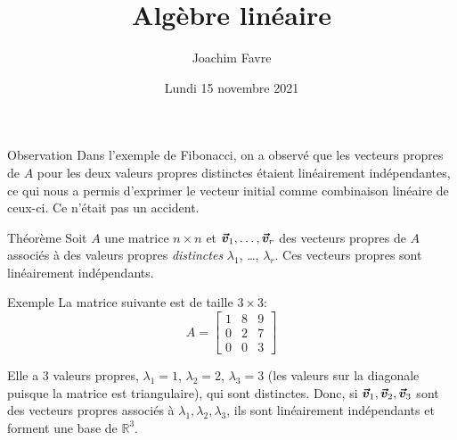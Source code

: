 \documentclass[a4paper]{article}
\title{Algèbre linéaire}
\author{Joachim Favre}
\date{Lundi 15 novembre 2021}
\begin{document}
\maketitle


\begin{parag}{Observation}
    Dans l'exemple de Fibonacci, on a observé que les vecteurs propres de $A$ pour les deux valeurs propres distinctes étaient linéairement indépendantes, ce qui nous a permis d'exprimer le vecteur initial comme combinaison linéaire de ceux-ci. Ce n'était pas un accident.
\end{parag}

\begin{parag}{Théorème}
    Soit $A$ une matrice $n\times n$ et $\bm{\protect\vec{v}}_1, \ldots, \bm{\protect\vec{v}}_r$ des vecteurs propres de $A$ associés à des valeurs propres \textit{distinctes} $\lambda_1$, \ldots, $\lambda_r$. Ces vecteurs propres sont linéairement indépendants.
\end{parag}

\begin{parag}{Exemple}
    La matrice suivante est de taille $3\times 3$: 
    \[A = \begin{bmatrix} 1 & 8 & 9 \\ 0 & 2 & 7 \\ 0 & 0 & 3 \end{bmatrix} \]
    
    Elle a 3 valeurs propres, $\lambda_1 = 1$, $\lambda_2 = 2$, $\lambda_3 = 3$ (les valeurs sur la diagonale puisque la matrice est triangulaire), qui sont distinctes. Donc, si $\bm{\protect\vec{v}}_1, \bm{\protect\vec{v}}_2, \bm{\protect\vec{v}}_3$ sont des vecteurs propres associés à $\lambda_1, \lambda_2, \lambda_3$, ils sont linéairement indépendants et forment une base de $\mathbb{R}^3$.
\end{parag}
\end{document}
